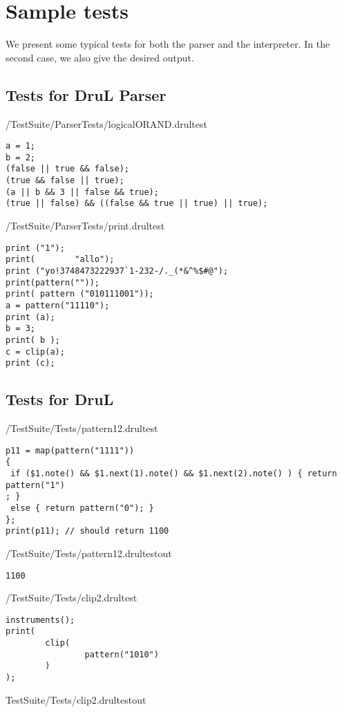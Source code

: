 \section{Sample tests} \label{ts:samples}
We present some typical tests for both the parser and the interpreter. In the
second case, we also give the desired output.

\subsection{Tests for DruL Parser}

/TestSuite/ParserTests/logicalORAND.drultest
\begin{lstlisting}
a = 1;
b = 2;
(false || true && false);
(true && false || true);
(a || b && 3 || false && true);
(true || false) && ((false && true || true) || true);
\end{lstlisting}


/TestSuite/ParserTests/print.drultest
\begin{lstlisting}
print ("1");
print(        "allo");
print ("yo!3748473222937`1-232-/._(*&^%$#@");
print(pattern(""));
print( pattern ("010111001"));
a = pattern("11110");
print (a);
b = 3;
print( b );
c = clip(a);
print (c);
\end{lstlisting}


\subsection{Tests for DruL}

/TestSuite/Tests/pattern12.drultest
\begin{lstlisting}
p11 = map(pattern("1111"))
{
 if ($1.note() && $1.next(1).note() && $1.next(2).note() ) { return pattern("1")
; }
 else { return pattern("0"); }
};
print(p11); // should return 1100
\end{lstlisting}

/TestSuite/Tests/pattern12.drultestout

\begin{lstlisting}
1100
\end{lstlisting}


/TestSuite/Tests/clip2.drultest
\begin{lstlisting}
instruments();
print(
        clip(
                pattern("1010")
        )
);
\end{lstlisting}

TestSuite/Tests/clip2.drultestout

